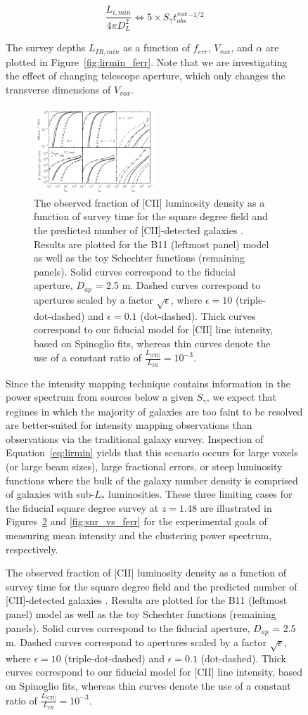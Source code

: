 \documentclass[iop,twocolappendix]{emulateapj}
\begin{document}
\begin{figure}[t]
\begin{equation}
\frac{L_{i,min}}{4\pi D_L^2} \Leftrightarrow 5 \times S_{\gamma} t_{obs}^{vox}^{-1/2}
\end{equation}

The survey depths $L_{IR,min}$ as a function of $f_{err}$, $V_{vox}$, and $\alpha$ are plotted in Figure~\ref{fig:lirmin_ferr}. Note that we are investigating the effect of changing telescope aperture, which only changes the transverse dimensions of $V_{vox}$.

\begin{figure}
\centering
\includegraphics[width=0.5\textwidth]{Ngal_fracCII_STARFIRE_1sqdeg_z1p5_ferr_0p1vpix_vpix_10vpix_alpham1p0_alpham2p0_b11}
\caption{The observed fraction of [CII] luminosity density as a function of survey time for the square degree field and the predicted number of [CII]-detected galaxies . Results are plotted for the B11 (leftmost panel) model as well as the toy Schechter functions (remaining panels). Solid curves correspond to the fiducial aperture, $D_{ap}$ = 2.5 m. Dashed curves correspond to apertures scaled by a factor $\sqrt{\epsilon}$, where $\epsilon=10$ (triple-dot-dashed) and $\epsilon=0.1$ (dot-dashed). Thick curves correspond to our fiducial model for [CII] line intensity, based on Spinoglio fits, whereas thin curves denote the use of a constant ratio of $\frac{L_{\textrm{[CII]}}}{L_{IR}} = 10^{-3}$.}
\label{fig:ngal_frac}
\end{figure}

Since the intensity mapping technique contains information in the power spectrum from sources below a given $S_{\gamma}$, we expect that regimes in which the majority of galaxies are too faint to be resolved are better-suited for intensity mapping observations than observations via the traditional galaxy survey. Inspection of Equation~\ref{eq:lirmin} yields that this scenario occurs for large voxels (or large beam sizes), large fractional errors, or steep luminosity functions where the bulk of the galaxy number density is comprised of galaxies with sub-$L_*$ luminosities. These three limiting cases for the fiducial square degree survey at $z=1.48$ are illustrated in Figures~\ref{fig:ngal_frac} and \ref{fig:snr_vs_ferr} for the experimental goals of measuring mean intensity and the clustering power spectrum, respectively.


\end{figure}
\end{document}
